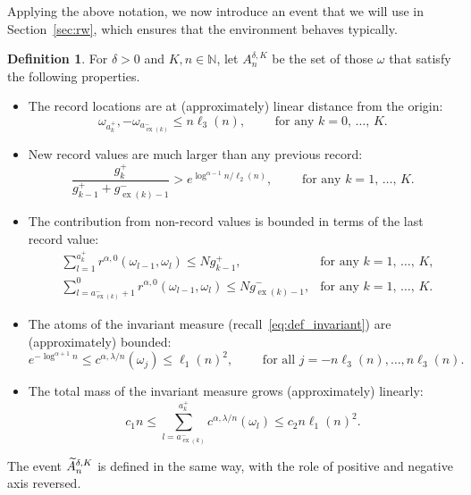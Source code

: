 \documentclass[10pt]{amsart}
\theoremstyle{definition}\newtheorem{defi}[theo]{Definition}\newtheorem{rema}[theo]{Remark}\newtheorem{exam}[theo]{Example}\newtheorem{exem}[theo]{Example}\newtheorem{nota}[theo]{Notation}
\newcommand{\N}{\mathbb N}
\newcommand\ex{\operatorname{ex}}
\newcommand{\aat}[1]{a_{\ex(#1)}^-}
\newcommand{\gtt}[1]{g_{\ex(#1)-1}^-}
\let\oldtilde\tilde
\renewcommand*{\tilde}[1]{\mathchoice{\widetilde{#1}}{\widetilde{#1}}{\oldtilde{#1}}{\oldtilde{#1}}}
\begin{document}
Applying the above notation, we now introduce an event that we will use in Section~\ref{sec:rw}, which ensures that the environment behaves typically.

\begin{defi}\label{def:A}
For $\delta>0$ and $K,n\in\N$, let $A^{\delta,K}_n$ be the set of those $\omega$ that satisfy the following properties.
\begin{itemize}
\item The record locations are at (approximately) linear distance from the origin:
\begin{equation}\label{eq:space_scaling}
\omega_{a_k^+},-\omega_{\aat{k}}\leq n\ell_3(n),\qquad\text{ for any }k=0,\,\dots,\,K.
\end{equation}
\item New record values are much larger than any previous record:
\begin{equation}\label{eq:separation}
\frac{g_{k}^+}{g_{k-1}^+ + \gtt{k}}> e^{\log^{\alpha-1} n/\ell_2(n)},\qquad\text{ for any }k=1,\,\dots,\,K.
\end{equation}
\item The contribution from non-record values is bounded in terms of the last record value:
\begin{align}
&{\textstyle \sum_{l=1}^{a_k^+} }r^{\alpha,0}(\omega_{l-1},\omega_{l})\le Ng_{k-1}^+,&\text{for any }k=1,\,\dots,\,K,\label{eq:NN+}
\\
&{\textstyle \sum_{l=\aat{k}+1}^0} r^{\alpha,0}(\omega_{l-1},\omega_l)\le N \gtt{k},&\text{for any }k=1,\,\dots,\,K.\label{eq:NN-}
\end{align}
\item The atoms of the invariant measure (recall~\eqref{eq:def_invariant}) are (approximately) boun\-ded:
\begin{equation}\label{eq:pointwise}
e^{-\log^{\alpha+1}n}\leq c^{\alpha,\lambda/n}(\omega_j)\leq \ell_1(n)^2,\qquad\text{ for all }j=-n\ell_3(n),\dots,n\ell_3(n).
\end{equation}
\item The total mass of the invariant measure grows (approximately) linearly:
\begin{equation}\label{eq:mass_control}
c_1n \le {\textstyle \sum_{l=\aat{k}}^{a_k^+}} c^{\alpha,\lambda/n}(\omega_l) \le c_2n \ell_1(n)^2.
\end{equation}
\end{itemize}
The event $\tilde A_n^{\delta,K}$ is defined in the same way, with the role of positive and negative axis reversed.
\end{defi}
\end{document}
